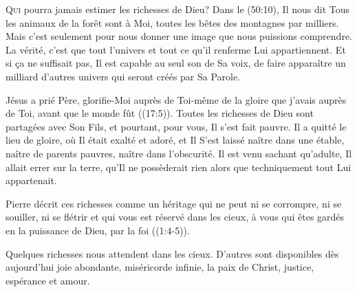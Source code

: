 

\lettrine{Q}{ui} pourra jamais estimer les richesses de Dieu?
 Dans le (50:10), Il nous dit\frcolon{} 
 \Og Tous les animaux de la forêt sont à Moi,
 toutes les bêtes des montagnes par milliers. \Fg{}
 Mais c'est seulement pour nous donner une image que nous puissions comprendre.
 La vérité, c'est que tout l'univers et tout ce qu'il renferme
 Lui appartiennent. Et si \c{c}a ne suffisait pas, Il est capable au seul son
 de Sa voix, de faire apparaître un milliard d'autres univers
 qui seront créés par Sa Parole.

Jésus a prié\frcolon{} 
 \Og Père, glorifie-Moi auprès de Toi-même de la gloire
 que j'avais auprès de Toi, avant que le monde fût \Fg{}
 ((17:5)).
 Toutes les richesses de Dieu sont partagées avec Son Fils, et pourtant,
 pour vous, Il s'est fait pauvre. Il a quitté le lieu de gloire,
 où Il était exalté et adoré, et Il S'est laissé naître dans une étable,
 naître de parents pauvres, naître dans l'obscurité.
 Il est venu sachant qu'adulte, Il allait errer sur la terre,
 qu'Il ne possèderait rien alors que techniquement tout Lui appartenait.


Pierre décrit ces richesses comme \Og un héritage qui ne peut ni se corrompre,
 ni se souiller, ni se flétrir et qui vous est réservé dans les cieux,
 à vous qui êtes gardés en la puissance de Dieu, par la foi \Fg{}
 ((1:4-5)). 

Quelques richesses nous attendent dans les cieux.
 D'autres sont disponibles dès aujourd'hui\frcolon{}
 joie abondante, miséricorde infinie, la paix de Christ,
 justice, espérance et amour.

\dvrule




